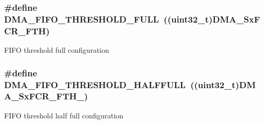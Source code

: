 \subsubsection[{\texorpdfstring{D\+M\+A\+\_\+\+F\+I\+F\+O\+\_\+\+T\+H\+R\+E\+S\+H\+O\+L\+D\+\_\+\+F\+U\+LL}{DMA_FIFO_THRESHOLD_FULL}}]{\setlength{\rightskip}{0pt plus 5cm}\#define D\+M\+A\+\_\+\+F\+I\+F\+O\+\_\+\+T\+H\+R\+E\+S\+H\+O\+L\+D\+\_\+\+F\+U\+LL~((uint32\+\_\+t)D\+M\+A\+\_\+\+Sx\+F\+C\+R\+\_\+\+F\+TH)}\hypertarget{group___d_m_a___f_i_f_o__threshold__level_ga5de463bb24dc12fe7bbb300e1e4493f7}{}\label{group___d_m_a___f_i_f_o__threshold__level_ga5de463bb24dc12fe7bbb300e1e4493f7}
F\+I\+FO threshold full configuration 
\subsubsection[{\texorpdfstring{D\+M\+A\+\_\+\+F\+I\+F\+O\+\_\+\+T\+H\+R\+E\+S\+H\+O\+L\+D\+\_\+\+H\+A\+L\+F\+F\+U\+LL}{DMA_FIFO_THRESHOLD_HALFFULL}}]{\setlength{\rightskip}{0pt plus 5cm}\#define D\+M\+A\+\_\+\+F\+I\+F\+O\+\_\+\+T\+H\+R\+E\+S\+H\+O\+L\+D\+\_\+\+H\+A\+L\+F\+F\+U\+LL~((uint32\+\_\+t)D\+M\+A\+\_\+\+Sx\+F\+C\+R\+\_\+\+F\+T\+H\+\_)}\hypertarget{group___d_m_a___f_i_f_o__threshold__level_gad2b071aa3a3bfc936017f12fb956c56f}{}\label{group___d_m_a___f_i_f_o__threshold__level_gad2b071aa3a3bfc936017f12fb956c56f}
F\+I\+FO threshold half full configuration 